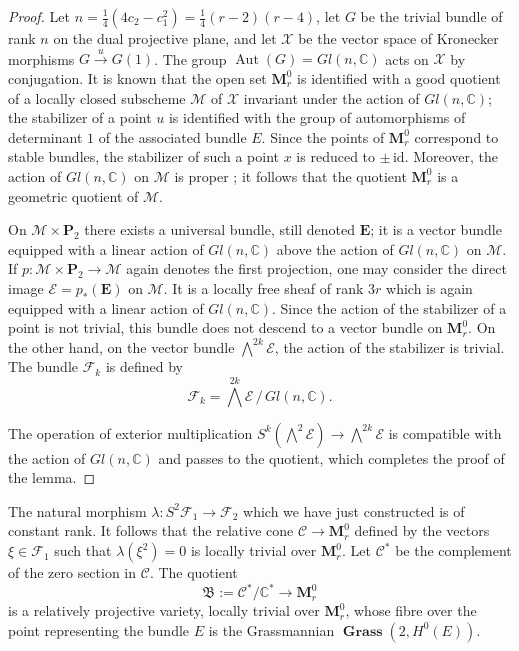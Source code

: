 \documentclass[12pt,english]{smfart}%
\theoremstyle{plain}
\theoremstyle{definition}
\theoremstyle{remark}
\newcommand{\PP}{\mathbf{P}}
\newcommand{\MM}{\mathbf{M}}           %
\newcommand{\CC}{\mathbb{C}}
\DeclareMathOperator{\Aut}{Aut}
\DeclareMathOperator{\Grass}{\mathbf{Grass}}
\begin{document}
\begin{proof}
Let $n=\tfrac14(4c_2-c_1^2)=\tfrac14(r-2)(r-4)$, let $G$ be the trivial bundle of rank $n$ on the dual projective plane, and let $\mathscr{X}$ be the vector space of Kronecker morphisms $G\xrightarrow{\;u\;}G(1)$. The group $\Aut(G)=Gl(n,\CC)$ acts on $\mathscr{X}$ by conjugation. It is known \cite{Bar} that the open set $\MM^0_r$ is identified with a good quotient of a locally closed subscheme $\mathscr{M}$ of $\mathscr{X}$ invariant under the action of $Gl(n,\CC)$; the stabilizer of a point $u$ is identified with the group of automorphisms of determinant $1$ of the associated bundle $E$. Since the points of $\MM^0_r$ correspond to stable bundles, the stabilizer of such a point $x$ is reduced to $\pm\,\mathrm{id}$. Moreover, the action of $Gl(n,\CC)$ on $\mathscr{M}$ is proper \cite{LeP2}; it follows that the quotient $\MM^0_r$ is a geometric quotient of $\mathscr{M}$.

On $\mathscr{M}\times\PP_2$ there exists a universal bundle, still denoted $\mathbf{E}$; it is a vector bundle equipped with a linear action of $Gl(n,\CC)$ above the action of $Gl(n,\CC)$ on $\mathscr{M}$. If $p:\mathscr{M}\times\PP_2\to\mathscr{M}$ again denotes the first projection, one may consider the direct image $\mathscr{E}=p_*(\mathbf{E})$ on $\mathscr{M}$. It is a locally free sheaf of rank $3r$ which is again equipped with a linear action of $Gl(n,\CC)$. Since the action of the stabilizer of a point is not trivial, this bundle does not descend to a vector bundle on $\MM^0_r$. On the other hand, on the vector bundle $\bigwedge^{2k}\mathscr{E}$, the action of the stabilizer is trivial. The bundle $\mathscr{F}_k$ is defined by
\[
\mathscr{F}_k = \textstyle\bigwedge^{2k}\mathscr{E}\,/\,Gl(n,\CC).
\]

The operation of exterior multiplication $S^k(\bigwedge^2\mathscr{E})\to\bigwedge^{2k}\mathscr{E}$ is compatible with the action of $Gl(n,\CC)$ and passes to the quotient, which completes the proof of the lemma.
\end{proof}

The natural morphism $\lambda:S^2\mathscr{F}_1\to\mathscr{F}_2$ which we have just constructed is of constant rank. It follows that the relative cone $\mathscr{C}\to\MM^0_r$ defined by the vectors $\xi\in\mathscr{F}_1$ such that $\lambda(\xi^2)=0$ is locally trivial over $\MM^0_r$. Let $\mathscr{C}^{*}$ be the complement of the zero section in $\mathscr{C}$. The quotient
\[
\mathfrak{B} := \mathscr{C}^{*}/\CC^{*}\longrightarrow \MM^0_r
\]
is a relatively projective variety, locally trivial over $\MM^0_r$, whose fibre over the point representing the bundle $E$ is the Grassmannian $\Grass(2,H^0(E))$.
\end{document}
